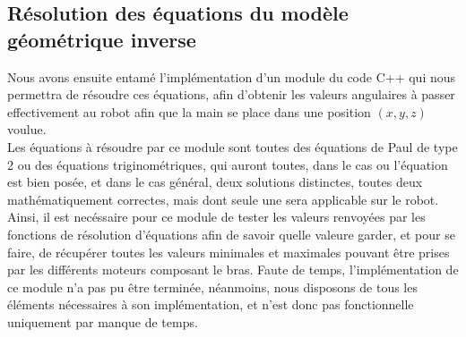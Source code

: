 \subsection{Résolution des équations du modèle géométrique inverse}

Nous avons ensuite entamé l'implémentation d'un module du code C++ qui nous permettra de résoudre ces équations, afin d'obtenir les valeurs angulaires à passer effectivement au robot afin que la main se place dans une position $(x, y, z)$ voulue.\\

Les équations à résoudre par ce module sont toutes des équations de Paul de type 2 ou des équations triginométriques, qui auront toutes, dans le cas ou l'équation est bien posée, et dans le cas général, deux solutions distinctes, toutes deux mathématiquement correctes, mais dont seule une sera applicable sur le robot. Ainsi, il est necéssaire pour ce module de tester les valeurs renvoyées par les fonctions de résolution d'équations afin de savoir quelle valeure garder, et pour se faire, de récupérer toutes les valeurs minimales et maximales pouvant être prises par les différents moteurs composant le bras.
\newpage
Faute de temps, l'implémentation de ce module n'a pas pu être terminée, néanmoins, nous disposons de tous les éléments nécessaires à son implémentation, et n'est donc pas fonctionnelle uniquement par manque de temps.
